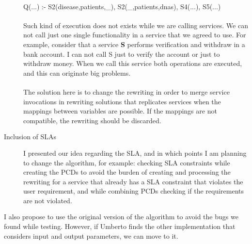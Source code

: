 \documentclass[12pt,a4paper,oneside]{report}
\begin{document}
\begin{description}
\\
Q(...) :- S2(disease,patients,\_), S2(\_,patients,dnas), S4(...), S5(...)
\\
\\
Such kind of execution does not exists while we are calling services. We can not call just one single functionality in a service that we agreed to use. For example, consider that a service \textbf{S} performs verification and withdraw in a bank account. I can not call S just to verify the account or just to withdraw money. When we call this service both operations are executed, and this can originate big problems.
\\
\\
The solution here is to change the rewriting in order to merge service invocations in rewriting solutions that replicates services when the mappings between variables are possible. If the mappings are not compatible, the rewriting should be discarded.
\item[Inclusion of SLAs] I presented our idea regarding the SLA, and in which points I am planning to change the algorithm, for example: checking SLA constraints while creating the PCDs to avoid the burden of creating and processing the rewriting for a service that already has a SLA constraint that violates the user requirement, and while combining PCDs checking if the requirements are not violated.
\end{description}

I also propose to use the original version of the algorithm to avoid the bugs we found while testing. However, if Umberto finds the other implementation that considers input and output parameters, we can move to it.
\end{document}
